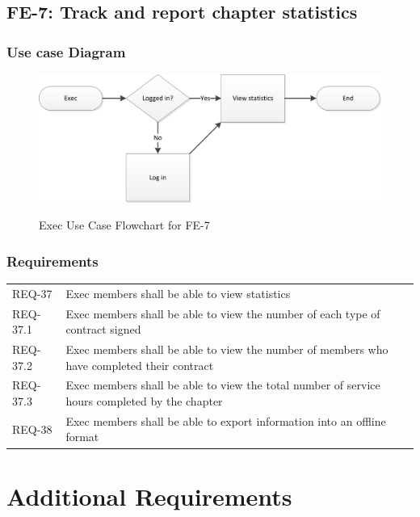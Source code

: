 \documentclass{article}
\newcommand{\req}[1]{REQ-{#1}}
\begin{document}
\subsection{FE-7: Track and report chapter statistics}

\subsubsection{Use case Diagram}

\newpage

\FloatBarrier
\begin{figure}
\centering
\caption{Exec Use Case Flowchart for FE-7}
\includegraphics[scale=.75]{img/execUseCaseFE7.png}
\label{fig:execUseCaseFE1}
\end{figure}
\FloatBarrier

\newpage

\subsubsection{Requirements}

\begin{tabular}{lp{8cm}}
\req{37} & Exec members shall be able to view statistics \\
\req{37.1} & Exec members shall be able to view the number of each
type of contract signed \\
\req{37.2} & Exec members shall be able to view the number of members
who have completed their contract\\
\req{37.3} & Exec members shall be able to view the total number of
service hours completed by the chapter\\
\req{38} & Exec members shall be able to export information into an
offline format\\
\end{tabular}

\section{Additional Requirements}
\end{document}
